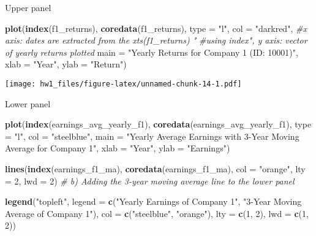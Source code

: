 \documentclass[
]{article}
\newenvironment{Shaded}{\begin{snugshade}}{\end{snugshade}}
\newcommand{\AttributeTok}[1]{\textcolor[rgb]{0.13,0.29,0.53}{#1}}
\newcommand{\CommentTok}[1]{\textcolor[rgb]{0.56,0.35,0.01}{\textit{#1}}}
\newcommand{\DecValTok}[1]{\textcolor[rgb]{0.00,0.00,0.81}{#1}}
\newcommand{\FunctionTok}[1]{\textcolor[rgb]{0.13,0.29,0.53}{\textbf{#1}}}
\newcommand{\NormalTok}[1]{#1}
\newcommand{\StringTok}[1]{\textcolor[rgb]{0.31,0.60,0.02}{#1}}
\begin{document}
Upper panel

\begin{Shaded}
\begin{Highlighting}[]
\FunctionTok{plot}\NormalTok{(}\FunctionTok{index}\NormalTok{(f1\_returns), }\FunctionTok{coredata}\NormalTok{(f1\_returns), }\AttributeTok{type =} \StringTok{"l"}\NormalTok{, }\AttributeTok{col =} \StringTok{"darkred"}\NormalTok{, }\CommentTok{\#x axis: dates are extracted from the xts(f1\_returns) "}
                                                                          \CommentTok{\#using index", y axis: vector of yearly returns plotted }
     \AttributeTok{main =} \StringTok{"Yearly Returns for Company 1 (ID: 10001)"}\NormalTok{, }\AttributeTok{xlab =} \StringTok{"Year"}\NormalTok{, }\AttributeTok{ylab =} \StringTok{"Return"}\NormalTok{)}
\end{Highlighting}
\end{Shaded}

\texttt{[image: hw1\_files/figure-latex/unnamed-chunk-14-1.pdf]}

Lower panel

\begin{Shaded}
\begin{Highlighting}[]
\FunctionTok{plot}\NormalTok{(}\FunctionTok{index}\NormalTok{(earnings\_avg\_yearly\_f1), }\FunctionTok{coredata}\NormalTok{(earnings\_avg\_yearly\_f1), }\AttributeTok{type =} \StringTok{"l"}\NormalTok{, }\AttributeTok{col =} \StringTok{"steelblue"}\NormalTok{,}
     \AttributeTok{main =} \StringTok{"Yearly Average Earnings with 3{-}Year Moving Average for Company 1"}\NormalTok{, }\AttributeTok{xlab =} \StringTok{"Year"}\NormalTok{, }\AttributeTok{ylab =} \StringTok{"Earnings"}\NormalTok{)}

\FunctionTok{lines}\NormalTok{(}\FunctionTok{index}\NormalTok{(earnings\_f1\_ma), }\FunctionTok{coredata}\NormalTok{(earnings\_f1\_ma), }\AttributeTok{col =} \StringTok{"orange"}\NormalTok{, }\AttributeTok{lty =} \DecValTok{2}\NormalTok{, }\AttributeTok{lwd =} \DecValTok{2}\NormalTok{) }\CommentTok{\# b) Adding the 3{-}year moving average line to the lower panel}

\FunctionTok{legend}\NormalTok{(}\StringTok{"topleft"}\NormalTok{, }\AttributeTok{legend =} \FunctionTok{c}\NormalTok{(}\StringTok{"Yearly Earnings of Company 1"}\NormalTok{, }\StringTok{"3{-}Year Moving Average of Company 1"}\NormalTok{), }\AttributeTok{col =} \FunctionTok{c}\NormalTok{(}\StringTok{"steelblue"}\NormalTok{, }\StringTok{"orange"}\NormalTok{), }\AttributeTok{lty =} \FunctionTok{c}\NormalTok{(}\DecValTok{1}\NormalTok{, }\DecValTok{2}\NormalTok{), }\AttributeTok{lwd =} \FunctionTok{c}\NormalTok{(}\DecValTok{1}\NormalTok{, }\DecValTok{2}\NormalTok{))}
\end{Highlighting}
\end{Shaded}
\end{document}
